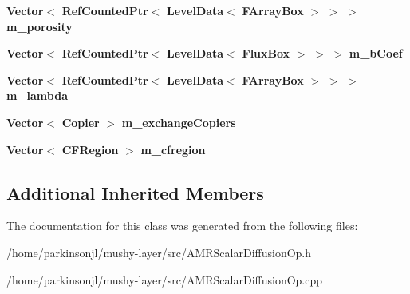 \begin{DoxyCompactItemize}
\mbox{\label{class_a_m_r_scalar_diffusion_op_factory_a1989ebbf81205f791580819caf591eec}} 
\textbf{ Vector}$<$ \textbf{ Ref\+Counted\+Ptr}$<$ \textbf{ Level\+Data}$<$ \textbf{ F\+Array\+Box} $>$ $>$ $>$ {\bfseries m\+\_\+porosity}
\item 
\mbox{\label{class_a_m_r_scalar_diffusion_op_factory_a67948d24f5c0b7443e52c6008a1dce8e}} 
\textbf{ Vector}$<$ \textbf{ Ref\+Counted\+Ptr}$<$ \textbf{ Level\+Data}$<$ \textbf{ Flux\+Box} $>$ $>$ $>$ {\bfseries m\+\_\+b\+Coef}
\item 
\mbox{\label{class_a_m_r_scalar_diffusion_op_factory_a59da9fd9b4736b1365f08c99bd254a72}} 
\textbf{ Vector}$<$ \textbf{ Ref\+Counted\+Ptr}$<$ \textbf{ Level\+Data}$<$ \textbf{ F\+Array\+Box} $>$ $>$ $>$ {\bfseries m\+\_\+lambda}
\item 
\mbox{\label{class_a_m_r_scalar_diffusion_op_factory_ae3980f9128653aeb9da85a828796bd35}} 
\textbf{ Vector}$<$ \textbf{ Copier} $>$ {\bfseries m\+\_\+exchange\+Copiers}
\item 
\mbox{\label{class_a_m_r_scalar_diffusion_op_factory_aed2fef547c2ae09a247a5d3759902ba7}} 
\textbf{ Vector}$<$ \textbf{ C\+F\+Region} $>$ {\bfseries m\+\_\+cfregion}
\end{DoxyCompactItemize}
\subsection*{Additional Inherited Members}


The documentation for this class was generated from the following files\+:\begin{DoxyCompactItemize}
\item 
/home/parkinsonjl/mushy-\/layer/src/A\+M\+R\+Scalar\+Diffusion\+Op.\+h\item 
/home/parkinsonjl/mushy-\/layer/src/A\+M\+R\+Scalar\+Diffusion\+Op.\+cpp\end{DoxyCompactItemize}
